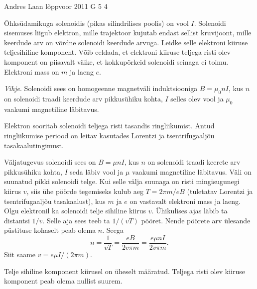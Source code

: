 {Andres Laan} %
{lõppvoor} %
{2011} %
{G 5} %
{4} %
{
\ifStatement
Õhksüdamikuga solenoidis (pikas silindrilises poolis) on vool
$I$. Solenoidi sisemuses liigub elektron, mille trajektoor kujutab endast sellist
kruvijoont, mille keerdude arv on võrdne solenoidi keerdude arvuga. Leidke
selle elektroni kiiruse teljesihiline komponent. Võib eeldada, et elektroni kiiruse teljega risti olev komponent on piisavalt väike, et kokkupõrkeid solenoidi
seinaga ei toimu. Elektroni mass on $m$ ja laeng $e$.

\emph{Vihje}. Solenoidi sees on
homogeenne magnetväli induktsiooniga $B = \mu_0nI$, kus $n$ on solenoidi traadi
keerdude arv pikkusühiku kohta, $I$ selles olev vool ja $\mu_0$ vaakumi magnetiline
läbitavus.
\fi


\ifHint
Elektron sooritab solenoidi teljega risti tasandis ringliikumist. Antud ringliikumise periood on leitav kasutades Lorentzi ja tsentrifugaaljõu tasakaalutingimust.
\fi


\ifSolution
Väljatugevus solenoidi sees on $B=\mu nI$, kus $n$ on solenoidi traadi keerete arv pikkusühiku kohta, $I$ seda läbiv vool ja $\mu$ vaakumi magnetiline läbitavus. Väli on suunatud pikki solenoidi telge. Kui selle välja suunaga on risti mingisugunegi kiirus $v$, siis ühe pöörde tegemiseks kulub aeg $T=2\pi m/eB$ (tuletatav Lorentzi ja tsentrifugaaljõu tasakaalust), kus $m$ ja $e$ on vastavalt elektroni mass ja laeng. Olgu elektronil ka solenoidi telje sihiline kiirus $v$. Ühikulises ajas läbib ta distantsi $1/v$. Selle aja sees teeb ta $1/(vT)$ pööret. Nende pöörete arv ülesande püstituse kohaselt peab olema $n$. Seega
\[
n=\frac{1}{vT}=\frac{eB}{2v\pi m}=\frac{e\mu nI}{2v\pi m}.
\]
Siit saame $v=e\mu I/(2\pi m)$.

Telje sihiline komponent kiirusel on üheselt määratud. Teljega risti olev kiiruse komponent peab olema nullist suurem.
\fi
}